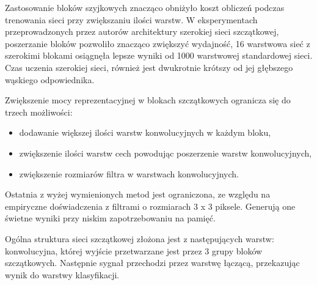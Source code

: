 \documentclass[12pt,a4paper,twoside,titlepage,openright]{book}
\begin{document}
Zastosowanie bloków szyjkowych znacząco obniżyło koszt obliczeń podczas trenowania sieci przy zwiększaniu ilości warstw. W eksperymentach przeprowadzonych przez autorów architektury szerokiej sieci szczątkowej, poszerzanie bloków pozwoliło znacząco zwiększyć wydajność, 16 warstwowa sieć z szerokimi blokami osiągnęła lepsze wyniki od 1000 warstwowej standardowej sieci. Czas uczenia szerokiej sieci, również jest dwukrotnie krótszy od jej głębszego wąskiego odpowiednika.

Zwiększenie mocy reprezentacyjnej w blokach szczątkowych ogranicza się do trzech możliwości:
\begin{itemize}
\item dodawanie większej ilości warstw konwolucyjnych w każdym bloku,
\item zwiększenie ilości warstw cech powodując poszerzenie warstw konwolucyjnych,
\item zwiększenie rozmiarów filtra w warstwach konwolucyjnych.
\end{itemize}

Ostatnia z wyżej wymienionych metod jest ograniczona, ze względu na empiryczne doświadczenia z filtrami o rozmiarach 3 x 3 piksele. Generują one świetne wyniki przy niskim zapotrzebowaniu na pamięć.

Ogólna struktura sieci szczątkowej złożona jest z następujących warstw: konwolucyjna, której wyjście przetwarzane jest przez 3 grupy bloków szczątkowych. Następnie sygnał przechodzi przez warstwę łączącą, przekazując wynik do warstwy klasyfikacji.

\cite{DBLP:journals/corr/ZagoruykoK16}
\end{document}
